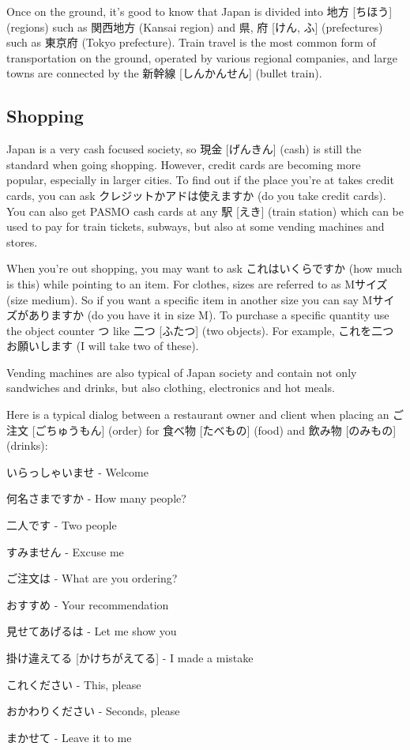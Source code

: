 \documentclass{article}
\begin{document}
\begin{CJK}{UTF8}{min}
\begin{multicols*}{3}
Once on the ground, it's good to know that Japan is divided into 地方 [ちほう] (regions) such as 関西地方 (Kansai region) and 県, 府 [けん, ふ] (prefectures) such as 東京府 (Tokyo 
prefecture). Train travel is the most common form of transportation on the ground, operated by various regional companies, and large towns are connected by the 新幹線 [しんかんせん] 
(bullet train).

\subsection{Shopping}

Japan is a very cash focused society, so 現金 [げんきん] (cash) is still the standard when going shopping. However, credit cards are becoming more popular, especially in larger 
cities. To find out if the place you're at takes credit cards, you can ask クレジットかアドは使えますか (do you take credit cards). You can also get PASMO cash cards at any 駅 [えき] 
(train station) which can be used to pay for train tickets, subways, but also at some vending machines and stores.

When you're out shopping, you may want to ask これはいくらですか (how much is this) while pointing to an item. For clothes, sizes are referred to as Mサイズ (size medium). So if you 
want a specific item in another size you can say Mサイズがありますか (do you have it in size M). To purchase a specific quantity use the object counter つ like 二つ [ふたつ] (two 
objects). For example, これを二つお願いします (I will take two of these).

Vending machines are also typical of Japan society and contain not only sandwiches and drinks, but also clothing, electronics and hot meals.

Here is a typical dialog between a restaurant owner and client when placing an ご注文 [ごちゅうもん] (order) for 食べ物 [たべもの] (food) and 飲み物 [のみもの] (drinks):

\begin{colorize}
\item いらっしゃいませ - Welcome
\item 何名さまですか - How many people?
\item 二人です - Two people
\item すみません - Excuse me
\item ご注文は - What are you ordering?
\item おすすめ - Your recommendation
\item 見せてあげるは - Let me show you
\item 掛け違えてる [かけちがえてる] - I made a mistake
\item これください - This, please
\item おかわりください - Seconds, please
\item まかせて - Leave it to me
\end{colorize}


\end{multicols*}
\end{CJK}
\end{document}

